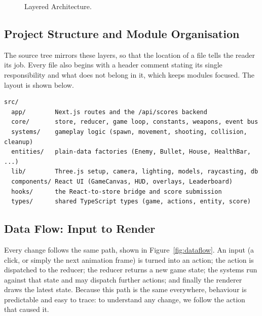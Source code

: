 \documentclass[12pt,a4paper]{report}
\begin{document}
\begin{figure}[htbp]
\centering
{}
\caption{Layered Architecture.}
\label{fig:layers}
\end{figure}

\subsection{Project Structure and Module Organisation}

The source tree mirrors these layers, so that the location of a file tells the
reader its job. Every file also begins with a header comment stating its single
responsibility and what does not belong in it, which keeps modules focused. The
layout is shown below.

\begin{verbatim}
src/
  app/        Next.js routes and the /api/scores backend
  core/       store, reducer, game loop, constants, weapons, event bus
  systems/    gameplay logic (spawn, movement, shooting, collision, cleanup)
  entities/   plain-data factories (Enemy, Bullet, House, HealthBar, ...)
  lib/        Three.js setup, camera, lighting, models, raycasting, db
  components/ React UI (GameCanvas, HUD, overlays, Leaderboard)
  hooks/      the React-to-store bridge and score submission
  types/      shared TypeScript types (game, actions, entity, score)
\end{verbatim}

\subsection{Data Flow: Input to Render}

Every change follows the same path, shown in Figure~\ref{fig:dataflow}. An input
(a click, or simply the next animation frame) is turned into an action; the
action is dispatched to the reducer; the reducer returns a new game state; the
systems run against that state and may dispatch further actions; and finally the
renderer draws the latest state. Because this path is the same everywhere,
behaviour is predictable and easy to trace: to understand any change, we follow
the action that caused it.
\end{document}
